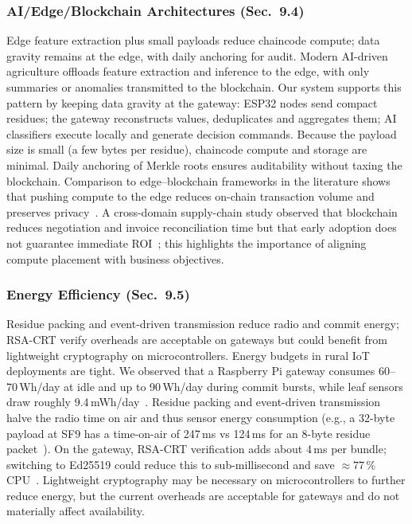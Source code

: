 \documentclass[12pt,onecolumn]{IEEEtran} %
\begin{document}
\subsubsection{AI/Edge/Blockchain Architectures (Sec.~9.4)}
Edge feature extraction plus small payloads reduce chaincode compute; data gravity remains at the edge, with daily anchoring for audit. Modern AI-driven agriculture offloads feature extraction and inference to the edge, with only summaries or anomalies transmitted to the blockchain. Our system supports this pattern by keeping data gravity at the gateway: ESP32 nodes send compact residues; the gateway reconstructs values, deduplicates and aggregates them; AI classifiers execute locally and generate decision commands. Because the payload size is small (a few bytes per residue), chaincode compute and storage are minimal. Daily anchoring of Merkle roots ensures auditability without taxing the blockchain. Comparison to edge–blockchain frameworks in the literature shows that pushing compute to the edge reduces on-chain transaction volume and preserves privacy~\cite{ref167328542643761}. A cross-domain supply-chain study observed that blockchain reduces negotiation and invoice reconciliation time but that early adoption does not guarantee immediate ROI~\cite{ref167328542643761}; this highlights the importance of aligning compute placement with business objectives.

\subsubsection{Energy Efficiency (Sec.~9.5)}
Residue packing and event-driven transmission reduce radio and commit energy; RSA-CRT verify overheads are acceptable on gateways but could benefit from lightweight cryptography on microcontrollers. Energy budgets in rural IoT deployments are tight. We observed that a Raspberry Pi gateway consumes 60–70\,Wh/day at idle and up to 90\,Wh/day during commit bursts, while leaf sensors draw roughly 9.4\,mWh/day~\cite{ref76853680998234}. Residue packing and event-driven transmission halve the radio time on air and thus sensor energy consumption (e.g., a 32-byte payload at SF9 has a time-on-air of 247\,ms vs 124\,ms for an 8-byte residue packet~\cite{ref76853680998234}). On the gateway, RSA-CRT verification adds about 4\,ms per bundle; switching to Ed25519 could reduce this to sub-millisecond and save $\approx77\,\%$ CPU~\cite{ref76853680998234}. Lightweight cryptography may be necessary on microcontrollers to further reduce energy, but the current overheads are acceptable for gateways and do not materially affect availability.
\end{document}
